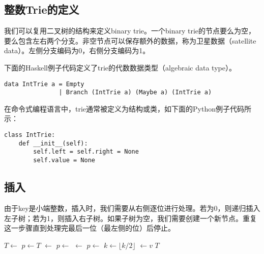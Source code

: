 \documentclass[UTF8]{article}
\begin{document}
\subsection{整数Trie的定义}
我们可以复用二叉树的结构来定义binary trie。一个binary trie的节点要么为空，要么包含左右两个分支。非空节点可以保存额外的数据，称为卫星数据（satellite data）。左侧分支编码为0，右侧分支编码为1。

下面的Haskell例子代码定义了trie的代数数据类型（algebraic data type）。

\lstset{language=Haskell}
\begin{lstlisting}
data IntTrie a = Empty
               | Branch (IntTrie a) (Maybe a) (IntTrie a)
\end{lstlisting}

在命令式编程语言中，trie通常被定义为结构或类，如下面的Python例子代码所示：

\lstset{language=Python}
\begin{lstlisting}
class IntTrie:
    def __init__(self):
        self.left = self.right = None
        self.value = None
\end{lstlisting}


\subsection{插入}

由于key是小端整数，插入时，我们需要从右侧逐位进行处理。若为0，则递归插入左子树；若为1，则插入右子树。如果子树为空，我们需要创建一个新节点。重复这一步骤直到处理完最后一位（最左侧的位）后停止。

\begin{algorithmic}[1]
    \State $T \gets$ 
  \EndIf
  \State $p \gets T$
        \State {} $\gets$ 
      \EndIf
      \State $p \gets$ 
    \Else
        \State {} $\gets$ 
      \EndIf
      \State $p \gets$ 
    \EndIf
    \State $k \gets \lfloor k/2 \rfloor$
  \EndWhile
  \State {} $\gets v$
  \State \Return $T$
\EndFunction
\end{algorithmic}
\end{document}
